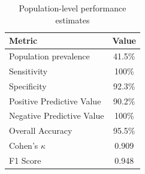         \begin{table}[h]
            \centering

            \begin{tabular}{lc}
            \toprule
            \textbf{Metric} & \textbf{Value} \\
            \midrule
            Population prevalence & 41.5\% \\
            Sensitivity & 100\% \\
            Specificity & 92.3\% \\
            Positive Predictive Value & 90.2\% \\
            Negative Predictive Value & 100\% \\
            Overall Accuracy & 95.5\% \\
            Cohen's $\kappa$ & 0.909 \\
            F1 Score & 0.948 \\
            \bottomrule
            \end{tabular}
            \caption{Population-level performance estimates}
            \label{tab:performance}
        \end{table}